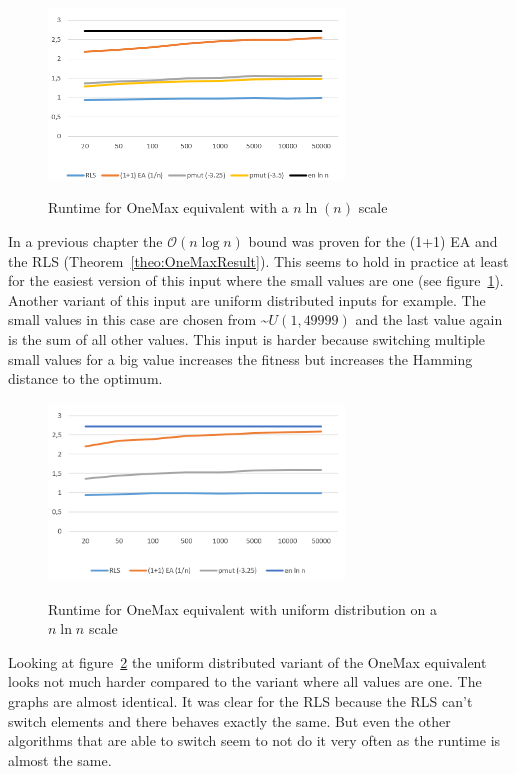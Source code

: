 \begin{figure}[h]
      \caption{Runtime for OneMax equivalent with a $n\ln(n)$ scale}
      \centering
      \includegraphics[width=0.7\textwidth]{figures/images/oneMaxMultipleN.png}\label{fig:onemaxNlogNBound}
\end{figure}

In a previous chapter the $\mathcal{O}(n\log n)$ bound was proven for the (1+1) EA and the RLS (Theorem~\ref{theo:OneMaxResult}).
This seems to hold in practice at least for the easiest version of this input where the small values are one (see figure~\ref{fig:onemaxNlogNBound}).
Another variant of this input are uniform distributed inputs for example.
The small values in this case are chosen from \textasciitilde$U(1,49999)$ and the last value again is the sum of all other values.
This input is harder because switching multiple small values for a big value increases the fitness but increases the Hamming distance to the optimum.

\begin{figure}[h]
      \caption{Runtime for OneMax equivalent with uniform distribution on a $n\ln n$ scale}
      \centering
      \includegraphics[width=0.7\textwidth]{figures/images/oneMaxUniformMultipleN.png}\label{fig:onemaxUniformNlogNBound}
\end{figure}

Looking at figure~\ref{fig:onemaxUniformNlogNBound} the uniform distributed variant of the OneMax equivalent looks not much harder compared to the variant where all values are one.
The graphs are almost identical.
It was clear for the RLS because the RLS can't switch elements and there behaves exactly the same.
But even the other algorithms that are able to switch seem to not do it very often as the runtime is almost the same.



